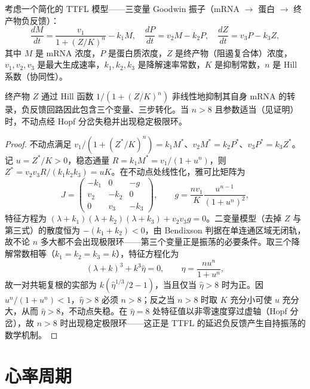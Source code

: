 \begin{proposition}[昼夜节律的数学模型]\label{prop:circadian_model}
考虑一个简化的 TTFL 模型——三变量 Goodwin 振子（mRNA $\to$ 蛋白 $\to$ 终产物负反馈）：
\[
\frac{dM}{dt} = \frac{v_1}{1 + (Z/K)^n} - k_1 M, \quad \frac{dP}{dt} = v_2 M - k_2 P, \quad \frac{dZ}{dt} = v_3 P - k_3 Z,
\]
其中 $M$ 是 mRNA 浓度，$P$ 是蛋白质浓度，$Z$ 是终产物（阻遏复合体）浓度，$v_1, v_2, v_3$ 是最大生成速率，$k_1, k_2, k_3$ 是降解速率常数，$K$ 是抑制常数，$n$ 是 Hill 系数（协同性）。

终产物 $Z$ 通过 Hill 函数 $1/(1+(Z/K)^n)$ 非线性地抑制其自身 mRNA 的转录，负反馈回路因此包含三个变量、三步转化。当 $n > 8$ 且参数适当（见证明）时，不动点经 Hopf 分岔失稳并出现稳定极限环。
\end{proposition}

\begin{proof}
不动点满足 $v_1/(1+(Z^*/K)^n) = k_1 M^*$、$v_2 M^* = k_2 P^*$、$v_3 P^* = k_3 Z^*$。记 $u = Z^*/K > 0$，稳态通量 $R = k_1 M^* = v_1/(1+u^n)$，则 $Z^* = v_2v_3R/(k_1k_2k_3) = uK$。在不动点处线性化，雅可比矩阵为
\[
J = \begin{pmatrix}
-k_1 & 0 & -g\\
v_2 & -k_2 & 0\\
0 & v_3 & -k_3
\end{pmatrix},
\qquad
g = \frac{n v_1}{K}\frac{u^{n-1}}{(1+u^n)^2},
\]
特征方程为 $(\lambda+k_1)(\lambda+k_2)(\lambda+k_3) + v_2v_3g = 0$。二变量模型（去掉 $Z$ 与第三式）的散度恒为 $-(k_1+k_2) < 0$，由 Bendixson 判据在单连通区域无闭轨，故不论 $n$ 多大都不会出现极限环——第三个变量正是振荡的必要条件。取三个降解常数相等（$k_1 = k_2 = k_3 = k$），特征方程化为
\[
(\lambda+k)^3 + k^3\hat\eta = 0,\qquad \hat\eta = \frac{n u^n}{1+u^n},
\]
故一对共轭复根的实部为 $k(\hat\eta^{1/3}/2 - 1)$，当且仅当 $\hat\eta > 8$ 时为正。因 $u^n/(1+u^n) < 1$，$\hat\eta > 8$ 必须 $n > 8$；反之当 $n > 8$ 时取 $K$ 充分小可使 $u$ 充分大，从而 $\hat\eta > 8$，不动点失稳。在 $\hat\eta = 8$ 处特征值以非零速度穿过虚轴（Hopf 分岔），故 $n > 8$ 时出现稳定极限环——这正是 TTFL 的延迟负反馈产生自持振荡的数学机制。
\end{proof}

\section{心率周期}


